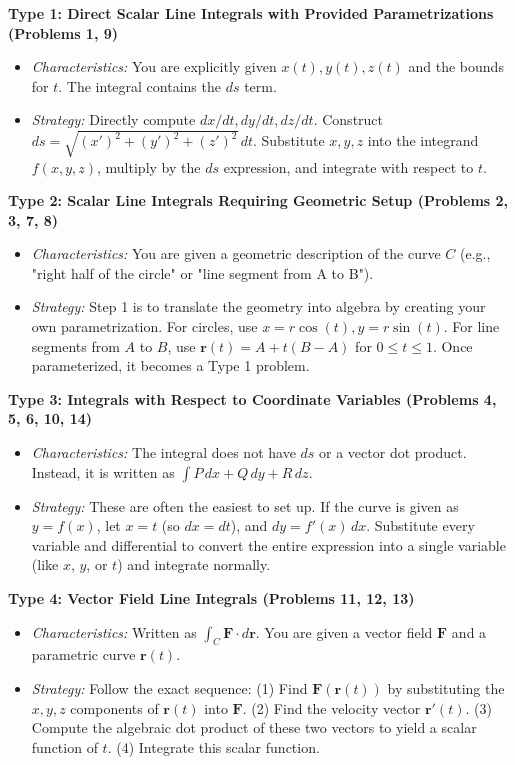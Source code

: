 \documentclass{article}
\begin{document}
\textbf{Type 1: Direct Scalar Line Integrals with Provided Parametrizations (Problems 1, 9)}
\begin{itemize}
    \item \textit{Characteristics:} You are explicitly given $x(t), y(t), z(t)$ and the bounds for $t$. The integral contains the $ds$ term.
    \item \textit{Strategy:} Directly compute $dx/dt, dy/dt, dz/dt$. Construct $ds = \sqrt{(x')^2 + (y')^2 + (z')^2} \, dt$. Substitute $x,y,z$ into the integrand $f(x,y,z)$, multiply by the $ds$ expression, and integrate with respect to $t$.
\end{itemize}

\textbf{Type 2: Scalar Line Integrals Requiring Geometric Setup (Problems 2, 3, 7, 8)}
\begin{itemize}
    \item \textit{Characteristics:} You are given a geometric description of the curve $C$ (e.g., "right half of the circle" or "line segment from A to B").
    \item \textit{Strategy:} Step 1 is to translate the geometry into algebra by creating your own parametrization. For circles, use $x = r\cos(t), y = r\sin(t)$. For line segments from $A$ to $B$, use $\mathbf{r}(t) = A + t(B-A)$ for $0 \leq t \leq 1$. Once parameterized, it becomes a Type 1 problem.
\end{itemize}

\textbf{Type 3: Integrals with Respect to Coordinate Variables (Problems 4, 5, 6, 10, 14)}
\begin{itemize}
    \item \textit{Characteristics:} The integral does not have $ds$ or a vector dot product. Instead, it is written as $\int P \, dx + Q \, dy + R \, dz$. 
    \item \textit{Strategy:} These are often the easiest to set up. If the curve is given as $y = f(x)$, let $x = t$ (so $dx = dt$), and $dy = f'(x) \, dx$. Substitute every variable and differential to convert the entire expression into a single variable (like $x$, $y$, or $t$) and integrate normally.
\end{itemize}

\textbf{Type 4: Vector Field Line Integrals (Problems 11, 12, 13)}
\begin{itemize}
    \item \textit{Characteristics:} Written as $\int_C \mathbf{F} \cdot d\mathbf{r}$. You are given a vector field $\mathbf{F}$ and a parametric curve $\mathbf{r}(t)$.
    \item \textit{Strategy:} Follow the exact sequence: (1) Find $\mathbf{F}(\mathbf{r}(t))$ by substituting the $x,y,z$ components of $\mathbf{r}(t)$ into $\mathbf{F}$. (2) Find the velocity vector $\mathbf{r}'(t)$. (3) Compute the algebraic dot product of these two vectors to yield a scalar function of $t$. (4) Integrate this scalar function.
\end{itemize}
\end{document}
